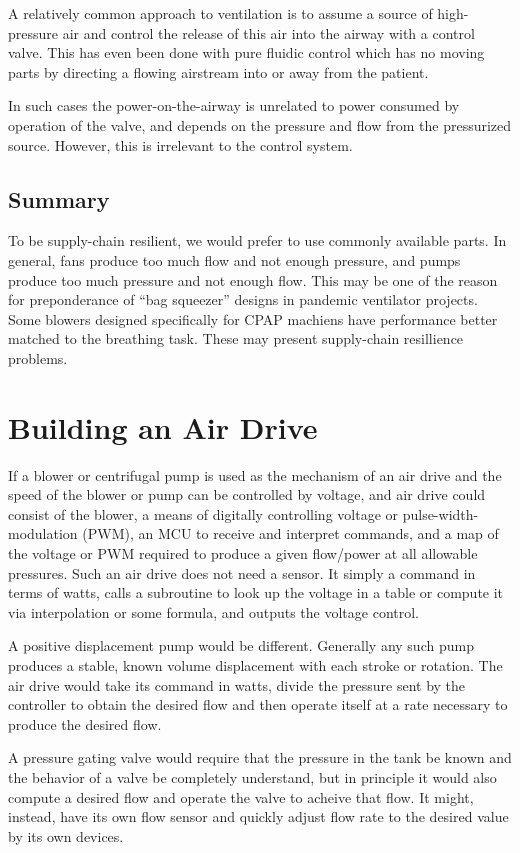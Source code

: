 \documentclass{article}
\begin{document}
A relatively common approach to ventilation is to assume a source of high-pressure air and control the release of this air
into the airway with a control valve. This has even been done with pure fluidic control which has no moving parts
by directing a flowing airstream into or away from the patient.

In such cases the power-on-the-airway is unrelated to power consumed by operation of the valve, and
depends on the pressure and flow from the pressurized source. However, this is irrelevant to the control system.

\subsection{Summary}

To be supply-chain resilient, we would prefer to use commonly available parts.
In general, fans produce too much flow and not enough pressure, and pumps produce too much pressure and not enough flow.
This may be one of the reason for preponderance of ``bag squeezer'' designs in pandemic ventilator projects.
Some blowers designed specifically for CPAP machiens have performance better matched to the breathing task.
These may present supply-chain resillience problems.


\section{Building an Air Drive}

If a blower or centrifugal pump is used as the mechanism of an air drive and the speed of the
blower or pump can be controlled by voltage, and air drive could consist of the blower,
a means of digitally controlling voltage or pulse-width-modulation (PWM), an MCU to receive and interpret commands, and
a map of the voltage  or PWM required to produce a given flow/power at all allowable pressures.
Such an air drive does not need a sensor.
It simply a command in terms of watts, calls a subroutine to look up the voltage in a table
or compute it via interpolation or some formula, and outputs the voltage control.

A positive displacement pump would be different. Generally any such pump produces a stable, known volume displacement with each
stroke or rotation. The air drive would take its command in watts, divide the pressure sent by the controller to obtain
the desired flow and then operate itself at a rate necessary to produce the desired flow.

A pressure gating valve would require that the pressure in the tank be known and the behavior of a valve
be completely understand, but in principle it would also compute a desired flow and operate the valve to acheive that
flow. It might, instead, have its own flow sensor and quickly adjust flow rate to the desired value by its own devices.
\end{document}
